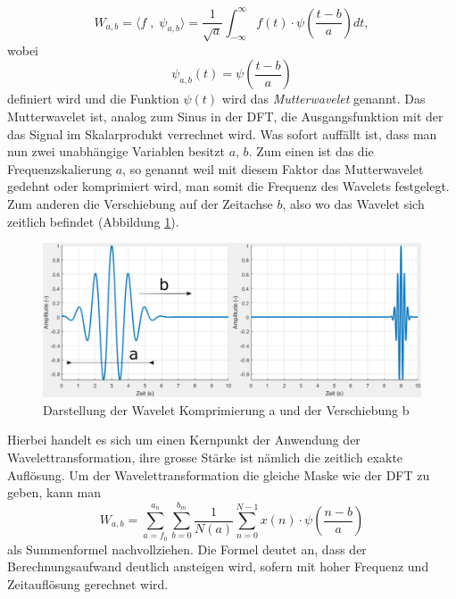 \begin{equation}
	W_{a,b}=\langle f \; , \; \psi_{a,b} \rangle = \frac{1}{\sqrt{a}}\int_{-\infty}^{\infty} f(t)\cdot\psi\left(\frac{t-b}{a}\right) dt,
	\label{wavelets:equation3}
\end{equation}
wobei
\[\psi_{a,b}(t)=\psi\left(\frac{t-b}{a}\right)\]
definiert wird und die Funktion $\psi(t)$ wird das {\em Mutterwavelet} genannt. Das Mutterwavelet ist, analog zum Sinus in der DFT, die Ausgangsfunktion mit der das Signal im Skalarprodukt verrechnet wird.
Was sofort auffällt ist, dass man nun zwei unabhängige Variablen besitzt $a$, $b$. Zum einen ist das die Frequenzskalierung $a$, so genannt weil mit diesem Faktor das Mutterwavelet gedehnt oder komprimiert wird, man somit die Frequenz des Wavelets festgelegt. Zum anderen die Verschiebung auf der Zeitachse $b$, also wo das Wavelet sich zeitlich befindet (Abbildung \ref{wavelet:fig:5_WaveletKompUndShift}).

\begin{figure}
	\centering
	\includegraphics[width=\textwidth]{papers/wavelets/images/5_WaveletKompUndShift.png}
	\caption{Darstellung der Wavelet Komprimierung a und der Verschiebung b}
	\label{wavelet:fig:5_WaveletKompUndShift}
\end{figure}

Hierbei handelt es sich um einen Kernpunkt der Anwendung der Wavelettransformation, ihre grosse Stärke ist nämlich die zeitlich exakte Auflösung. Um der Wavelettransformation die gleiche Maske wie der DFT zu geben, kann man
\begin{equation}
	W_{a,b}=\sum_{a=f_0}^{a_n}\sum_{b=0}^{b_m}\frac{1}{N(a)}\sum_{n=0}^{N-1} x(n)\cdot\psi\left(\frac{n-b}{a}\right)
	\label{wavelets:equation4}
\end{equation}
als Summenformel nachvollziehen. Die Formel deutet an, dass der Berechnungsaufwand deutlich ansteigen wird, sofern mit hoher Frequenz und Zeitauflösung gerechnet wird.

